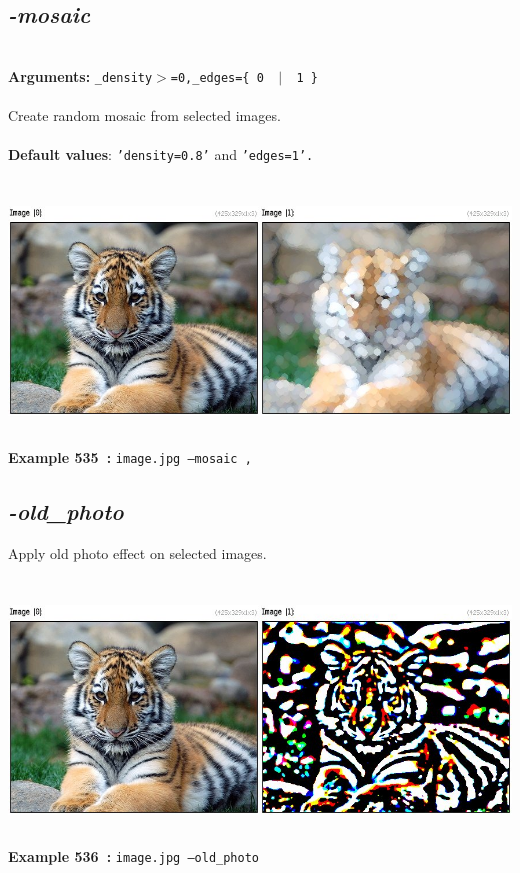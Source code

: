 \documentclass[a4paper,11pt,twoside]{book}
\begin{document}
\subsection{\emph{-mosaic} }\vspace*{-0.5em}
~\\\textbf{Arguments: } 
{\small \texttt{\_density$>$=0,\_edges=\{ 0 ~$|$~ 1 \}}}\\~\\
Create random mosaic from selected images.
~\\~\\\textbf{Default values}: {\small \texttt{'density=0.8'} and \texttt{'edges=1'.}}
\begin{center}\includegraphics[keepaspectratio=true,height=7cm,width=\textwidth]{img/gmic_def535.jpg}\\
{\footnotesize \textbf{Example 535~:} \texttt{image.jpg --mosaic ,}}
\end{center}

\subsection{\emph{-old\_photo} }\vspace*{-0.5em}
Apply old photo effect on selected images.
\begin{center}\includegraphics[keepaspectratio=true,height=7cm,width=\textwidth]{img/gmic_def536.jpg}\\
{\footnotesize \textbf{Example 536~:} \texttt{image.jpg --old\_photo}}
\end{center}
\end{document}
